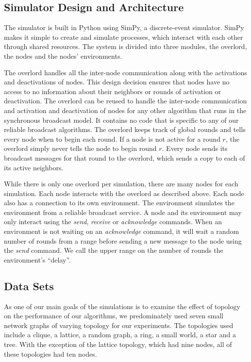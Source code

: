\documentclass[english]{article}
\begin{document}
\subsection{Simulator Design and Architecture}

The simulator is built in Python using SimPy, a discrete-event simulator. SimPy makes it simple to create and simulate processes, which interact with each other through shared resources. The system is divided into three modules, the overlord, the nodes and the nodes' environments. 

The overlord handles all the inter-node communication along with the activations and deactivations of nodes. This design decision ensures that nodes have no access to no information about their neighbors or rounds of activation or deactivation. The overlord can be reused to handle the inter-node communication and activation and deactivation of nodes for any other algorithm that runs in the synchronous broadcast model. It contains no code that is specific to any of our reliable broadcast algorithms. The overlord keeps track of global rounds and tells every node when to begin each round. If a node is not active for a round $r$, the overlord simply never tells the node to begin round $r$. Every node sends its broadcast messages for that round to the overlord, which sends a copy to each of its active neighbors. 

While there is only one overlord per simulation, there are many nodes for each simulation. Each node interacts with the overlord as described above. Each node also has a connection to its own environment. The environment simulates the environment from a reliable broadcast service. A node and its environment may only interact using the \textit{send}, \textit{receive} or \textit{acknowledge} commands. When an environment is not waiting on an \textit{acknowledge} command, it will wait a random number of rounds from a range before sending a new message to the node using the \textit{send} command. We call the upper range on the number of rounds the environment's ``delay''.


\subsection{Data Sets}

As one of our main goals of the simulations is to examine the effect of topology on the performance of our algorithms, we predominately used seven small network graphs of varying topology for our experiments. The topologies used include a clique, a lattice, a random graph, a ring, a small world, a star and a tree. With the exception of the lattice topology, which had nine nodes, all of these topologies had ten nodes.
\end{document}
